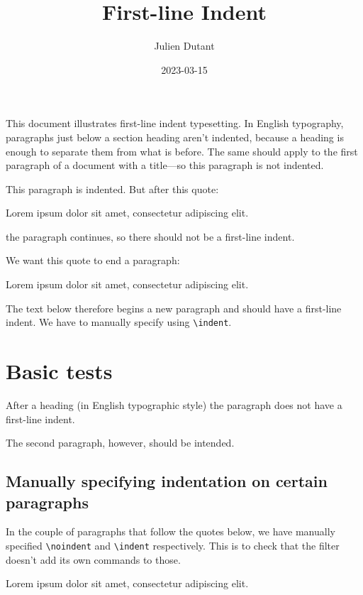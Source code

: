 \documentclass[
  letterpaper,
  DIV=11,
  numbers=noendperiod]{scrartcl}
\title{First-line Indent}
\author{Julien Dutant}
\date{2023-03-15}
\makeatletter
\renewenvironment{quote}
     {\list{}{\listparindent 1.5em%
              \itemindent \listparindent
              \rightmargin \leftmargin
              \parsep \z@ \@plus \p@}%
            \item\noindent\relax}
      {\endlist}
\makeatother
\begin{document}
\maketitle


\noindent This document illustrates first-line indent typesetting. In
English typography, paragraphs just below a section heading aren't
indented, because a heading is enough to separate them from what is
before. The same should apply to the first paragraph of a document with
a title---so this paragraph is not indented.

This paragraph is indented. But after this quote:

\begin{quote}
\noindent Lorem ipsum dolor sit amet, consectetur adipiscing elit.
\end{quote}

\noindent the paragraph continues, so there should not be a first-line
indent.

We want this quote to end a paragraph:

\begin{quote}
\noindent Lorem ipsum dolor sit amet, consectetur adipiscing elit.
\end{quote}

\indent The text below therefore begins a new paragraph and should have
a first-line indent. We have to manually specify using
\texttt{\textbackslash{}indent}.

\section{Basic tests}\label{basic-tests}

After a heading (in English typographic style) the paragraph does not
have a first-line indent.

The second paragraph, however, should be intended.

\subsection{Manually specifying indentation on certain
paragraphs}\label{manually-specifying-indentation-on-certain-paragraphs}

In the couple of paragraphs that follow the quotes below, we have
manually specified \texttt{\textbackslash{}noindent} and
\texttt{\textbackslash{}indent} respectively. This is to check that the
filter doesn't add its own commands to those.

\begin{quote}
\noindent Lorem ipsum dolor sit amet, consectetur adipiscing elit.
\end{quote}
\end{document}
